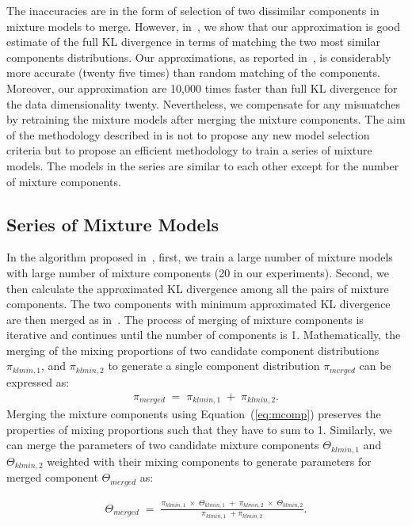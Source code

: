 The inaccuracies are in the 
form of selection of two dissimilar components in mixture models to
merge.  However, in~, we show that our approximation is 
good estimate of the full KL divergence in terms of matching
the two most similar components distributions. Our approximations, 
as reported  in~, is considerably more accurate (twenty 
five times) than random matching of the components. Moreover, our 
approximation are  10,000 times faster than full KL
divergence for the data dimensionality twenty. Nevertheless, 
we compensate for any mismatches by retraining the mixture 
models after merging the mixture components. The aim of 
the methodology described in  is not to propose 
any new model selection criteria but to propose an efficient 
methodology to train a series of mixture models. The models 
in the series are similar to each other except for the number 
of mixture components. 

\subsection{Series of Mixture Models}
\label{ss:series}

In the algorithm proposed in~, first, we train a large number of mixture models
with large number of mixture components (20 in our experiments). Second, we then calculate 
the approximated KL divergence among all the pairs of mixture components. The two 
components with minimum approximated KL divergence are then merged as in~\cite{ueda2000}.
The process of merging of mixture components is iterative and continues until the number
of components is 1.
Mathematically, the merging of the mixing proportions of
two candidate component distributions $\pi_{klmin,1}$, and
$\pi_{klmin,2}$ to generate a single component distribution 
$\pi_{merged}$ can be expressed as:
\begin{eqnarray}
\label{eq:mcomp}
\pi_{merged} \; = \; \pi_{klmin,1}\; + \; \pi_{klmin,2}. 
\end{eqnarray}
Merging the mixture components using Equation~(\ref{eq:mcomp})
preserves the properties of mixing proportions such that they 
have to sum to 1. Similarly, we can merge the parameters of 
two candidate mixture components $\Theta_{klmin,1}$ and 
$\Theta_{klmin,2}$ weighted with their mixing components 
to generate parameters for merged component $\Theta_{merged}$ as:

\begin{eqnarray}
\label{eq:wmparam}
\Theta_{merged} \; = \; \frac{\pi_{klmin,1} \; \times \; \Theta_{klmin,1}\; + \; \pi_{klmin,2} \; \times \; \Theta_{klmin,2}} {\pi_{klmin,1} \; + \pi_{klmin,2}}. 
\end{eqnarray}

